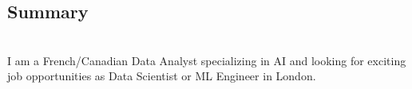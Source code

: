 \begin{adjustwidth}{42pt}{50pt}
\section{Summary}
\\
I am a French/Canadian Data Analyst specializing in AI and looking for exciting job opportunities as Data Scientist or ML Engineer in London.
\end{adjustwidth}
